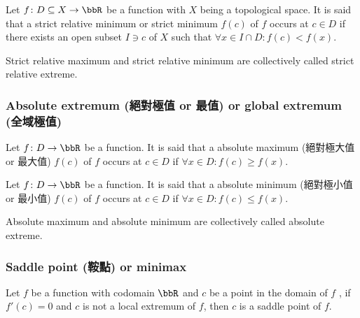 Let $f\colon D\subseteq X\to\bbR$ be a function with $X$ being a topological space. It is said that a strict relative minimum or strict minimum \( f(c) \) of \(f\) occurs at $c\in D$ if there exists an open subset $I\ni c$ of $X$ such that \( \forall x\in I\cap D\colon f(c) < f(x) \).

Strict relative maximum and strict relative minimum are collectively called strict relative extreme.
\subsubsection{Absolute extremum (絕對極值 or 最值) or global extremum (全域極值)}
Let $f\colon D\to\bbR$ be a function. It is said that a absolute maximum (絕對極大值 or 最大值) \( f(c) \) of \(f\) occurs at $c\in D$ if \( \forall x\in D\colon f(c) \geq f(x) \).

Let $f\colon D\to\bbR$ be a function. It is said that a absolute minimum (絕對極小值 or 最小值) \( f(c) \) of \(f\) occurs at $c\in D$ if \( \forall x\in D\colon f(c) \leq f(x) \).

Absolute maximum and absolute minimum are collectively called absolute extreme.
\subsubsection{Saddle point (鞍點) or minimax}
Let $f$ be a function with codomain $\bbR$ and \( c \) be a point in the domain of $f$ , if \( f'(c) = 0 \) and $c$ is not a local extremum of $f$, then $c$ is a saddle point of $f$.
